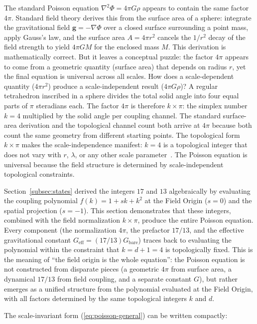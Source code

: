 \documentclass[aps,prd,preprint,superscriptaddress,showpacs,preprintnumbers,amsmath,amssymb,nofootinbib]{revtex4-2}
\begin{document}
The standard Poisson equation $\nabla^2\Phi = 4\pi G\rho$ appears to contain the same factor $4\pi$. Standard field theory derives this from the surface area of a sphere: integrate the gravitational field $\mathbf{g} = -\nabla\Phi$ over a closed surface surrounding a point mass, apply Gauss's law, and the surface area $A = 4\pi r^2$ cancels the $1/r^2$ decay of the field strength to yield $4\pi G M$ for the enclosed mass $M$. This derivation is mathematically correct. But it leaves a conceptual puzzle: the factor $4\pi$ appears to come from a geometric quantity (surface area) that depends on radius $r$, yet the final equation is universal across all scales. How does a scale-dependent quantity ($4\pi r^2$) produce a scale-independent result ($4\pi G\rho$)? A regular tetrahedron inscribed in a sphere divides the total solid angle into four equal parts of $\pi$ steradians each. The factor $4\pi$ is therefore $k \times \pi$: the simplex number $k = 4$ multiplied by the solid angle per coupling channel. The standard surface-area derivation and the topological channel count both arrive at $4\pi$ because both count the same geometry from different starting points. The topological form $k \times \pi$ makes the scale-independence manifest: $k = 4$ is a topological integer that does not vary with $r$, $\lambda$, or any other scale parameter~\cite{mtw1973,wald1984}. The Poisson equation is universal because the field structure is determined by scale-independent topological constraints.

Section~\ref{subsec:states} derived the integers $17$ and $13$ algebraically by evaluating the coupling polynomial $f(k) = 1 + sk + k^2$ at the Field Origin ($s=0$) and the spatial projection ($s=-1$). This section demonstrates that these integers, combined with the field normalization $k\times\pi$, produce the entire Poisson equation. Every component (the normalization $4\pi$, the prefactor $17/13$, and the effective gravitational constant $G_{\text{eff}} = (17/13)G_{\text{bare}}$) traces back to evaluating the polynomial within the constraint that $k = d+1 = 4$ is topologically fixed. This is the meaning of ``the field origin is the whole equation'': the Poisson equation is not constructed from disparate pieces (a geometric $4\pi$ from surface area, a dynamical $17/13$ from field coupling, and a separate constant $G$), but rather emerges as a unified structure from the polynomial evaluated at the Field Origin, with all factors determined by the same topological integers $k$ and $d$.

The scale-invariant form (\ref{eq:poisson-general}) can be written compactly:
\end{document}
